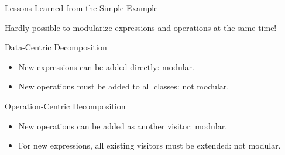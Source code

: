 \begin{frame}{Lessons Learned from the Simple Example}
	\begin{note}{}
		Hardly possible to modularize expressions and operations at the same time!
	\end{note}
	\pause
	\begin{fancycolumns}
		\begin{note}{Data-Centric Decomposition}
			\begin{itemize}
				\item New expressions can be added directly: modular.
				\item New operations must be added to all classes: not modular.
			\end{itemize}
		\end{note}
	\nextcolumn
		\begin{note}{Operation-Centric Decomposition}
			\begin{itemize}
				\item New operations can be added as another visitor: modular.
				\item For new expressions, all existing visitors must be extended: not modular.
			\end{itemize}
		\end{note}	
	\end{fancycolumns}
\end{frame}